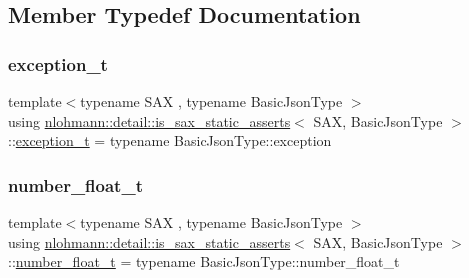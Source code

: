 \subsection{Member Typedef Documentation}
\mbox{\label{structnlohmann_1_1detail_1_1is__sax__static__asserts_a34e1bc8ab7adbbab5f7d8c45a964020b}} 
\subsubsection{\texorpdfstring{exception\+\_\+t}{exception\_t}}
{\footnotesize\ttfamily template$<$typename S\+AX , typename Basic\+Json\+Type $>$ \\
using \hyperlink{structnlohmann_1_1detail_1_1is__sax__static__asserts}{nlohmann\+::detail\+::is\+\_\+sax\+\_\+static\+\_\+asserts}$<$ S\+AX, Basic\+Json\+Type $>$\+::\hyperlink{structnlohmann_1_1detail_1_1is__sax__static__asserts_a34e1bc8ab7adbbab5f7d8c45a964020b}{exception\+\_\+t} =  typename Basic\+Json\+Type\+::exception\hspace{0.3cm}{\ttfamily [private]}}

\mbox{\label{structnlohmann_1_1detail_1_1is__sax__static__asserts_a65d4be40c41ddc31fd2c3583d87d5faf}} 
\subsubsection{\texorpdfstring{number\+\_\+float\+\_\+t}{number\_float\_t}}
{\footnotesize\ttfamily template$<$typename S\+AX , typename Basic\+Json\+Type $>$ \\
using \hyperlink{structnlohmann_1_1detail_1_1is__sax__static__asserts}{nlohmann\+::detail\+::is\+\_\+sax\+\_\+static\+\_\+asserts}$<$ S\+AX, Basic\+Json\+Type $>$\+::\hyperlink{structnlohmann_1_1detail_1_1is__sax__static__asserts_a65d4be40c41ddc31fd2c3583d87d5faf}{number\+\_\+float\+\_\+t} =  typename Basic\+Json\+Type\+::number\+\_\+float\+\_\+t\hspace{0.3cm}{\ttfamily [private]}}

